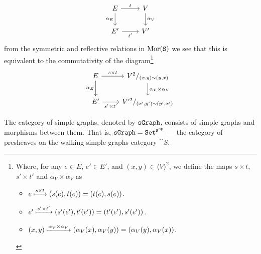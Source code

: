 \begin{definition}
\begin{itemize}
\[                  \begin{tikzcd}
                      E \ar[r, "t"] \ar[d, swap, "\alpha_E"] &V \ar[d, "\alpha_V"]
                      \\
                      E' \ar[r, swap, "t'"] &V'
                  \end{tikzcd}
              \]
              from the symmetric and reflective relations in \(\operatorname{Mor}(\texttt S)\) we see
              that this is equivalent to the commutativity of the diagram\footnote{
                  Where, for any \(e \in E\), \(e' \in E'\), and \((x, y) \in \langle V
                  \rangle^2\), we define the maps \(s \times t\), \(s' \times t'\) and
                  \(\alpha_V \times \alpha_V\) as
                  \begin{itemize}
                      \setlength\itemsep{0.0em}
                      \item \(e \xmapsto{s \times t} (s(e), t(e)) = (t(e), s(e))\).
                      \item \(e' \xmapsto{s' \times t'} (s'(e'), t'(e')) = (t'(e'),
                            s'(e'))\).
                      \item \((x, y) \xmapsto{\alpha_V \times \alpha_V} (\alpha_V(x),
                            \alpha_V(y)) = (\alpha_V(y), \alpha_V(x))\).
                  \end{itemize}
              }
              \[
                  \begin{tikzcd}
                      E \ar[r, "s \times t"]
                      \ar[d, swap, "\alpha_E"]
                      &V^2/_{(x, y) \sim (y, x)}
                      \ar[d, "\alpha_V \times \alpha_V"]
                      \\
                      E' \ar[r, swap, "s' \times t'"] &V'^2/_{(x', y') \sim (y', x')}
                  \end{tikzcd}
              \]
    \end{itemize}
\end{definition}

\begin{definition}
    The category of simple graphs, denoted by \({\texttt{sGraph}}\), consists of
    simple graphs and morphisms between them. That is, \({\texttt{sGraph}} = {\texttt{Set}}^{\texttt
        S^{\mathrm{op}}}\) --- the category of presheaves on the walking simple graphs category
    \(\cat S\).
\end{definition}
